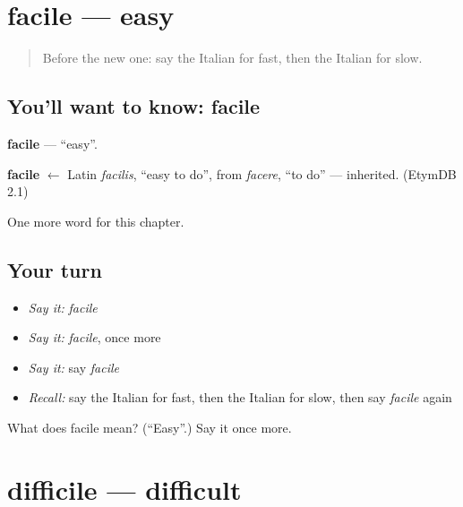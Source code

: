 \section[facile]{facile — easy}

\label{lesson:IT-C74-facile}



\begin{quote}
Before the new one: say the Italian for fast, then the Italian for slow.
\end{quote}

\subsection*{You'll want to know: facile}
\textbf{facile} — \textquotedblleft{}easy\textquotedblright{}.

\begin{cousinweb}
\textbf{facile} $\leftarrow$ Latin \emph{facilis}, \textquotedblleft{}easy to do\textquotedblright{}, from \emph{facere}, \textquotedblleft{}to do\textquotedblright{} — inherited. (EtymDB 2.1)
\end{cousinweb}

\begin{grammarlens}[title={What you've built}]
One more word for this chapter.
\end{grammarlens}

\subsection*{Your turn}
\begin{itemize}
\raggedright
  \item \emph{Say it:} \emph{facile}
  \item \emph{Say it:} \emph{facile}, once more
  \item \emph{Say it:} say \emph{facile}
  \item \emph{Recall:} say the Italian for fast, then the Italian for slow, then say \emph{facile} again
\end{itemize}

\begin{tcolorbox}[breakable,colback=teal!4,colframe=teal!35!black,title={Before you move on}]
What does facile mean? (\textquotedblleft{}Easy\textquotedblright{}.) Say it once more.
\end{tcolorbox}
\section[difficile]{difficile — difficult}

